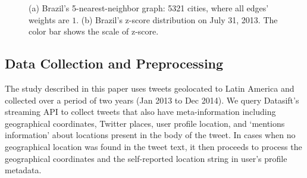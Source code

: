 \documentclass[twoside,leqno,twocolumn]{article}
\begin{document}
\begin{figure}[t]
	\centering
    \vspace{-2mm}
	\caption{(a) Brazil's 5-nearest-neighbor graph: 5321 cities, where
all edges' weights are $1$. (b) Brazil's z-score distribution on July 31, 2013. The color bar shows the scale of z-score.}
	\label{fig:knn_zscore}
\end{figure}

\subsection{Data Collection and Preprocessing}
\label{sec:data_collection}
The study described in this paper uses tweets geolocated to Latin America and collected over a period of two years (Jan 2013 to Dec 2014). We query Datasift's streaming API to collect tweets that also have meta-information including geographical coordinates, Twitter places, user profile location, and `mentions information' about locations present in the body of the tweet.
In cases when no geographical location was found in the tweet text, it then proceeds to process the geographical coordinates and the self-reported location string in user's profile metadata.
\end{document}
